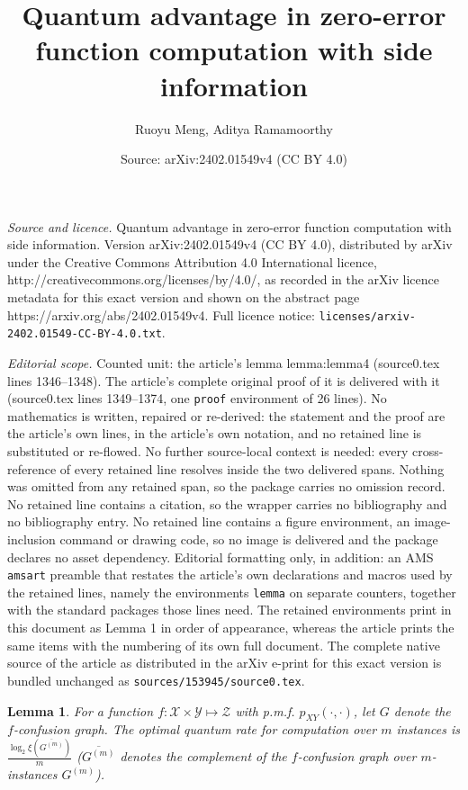 \documentclass[10pt,a4paper]{amsart}
\title{Quantum advantage in zero-error function computation with side information}
\author{Ruoyu Meng, Aditya Ramamoorthy}
\date{Source: arXiv:2402.01549v4 (CC BY 4.0)}
\newtheorem{lemma}{Lemma}
\newcommand{\calX}{\mathcal{X}}
\newcommand{\calY}{\mathcal{Y}}
\newcommand{\calZ}{\mathcal{Z}}
\begin{document}
\maketitle

\noindent\emph{Source and licence.} Quantum advantage in zero-error function computation with side information. Version arXiv:2402.01549v4 (CC BY 4.0), distributed by arXiv under the Creative Commons Attribution 4.0 International licence, http://creativecommons.org/licenses/by/4.0/, as recorded in the arXiv licence metadata for this exact version and shown on the abstract page https://arxiv.org/abs/2402.01549v4. Full licence notice: \texttt{licenses/arxiv-2402.01549-CC-BY-4.0.txt}.\par\smallskip

\noindent\textit{Editorial scope.} Counted unit: the article's lemma lemma:lemma4 (source0.tex lines 1346--1348). The article's complete original proof of it is delivered with it (source0.tex lines 1349--1374, one \texttt{proof} environment of 26 lines). No mathematics is written, repaired or re-derived: the statement and the proof are the article's own lines, in the article's own notation, and no retained line is substituted or re-flowed.  No further source-local context is needed: every cross-reference of every retained line resolves inside the two delivered spans.  Nothing was omitted from any retained span, so the package carries no omission record.  No retained line contains a citation, so the wrapper carries no bibliography and no bibliography entry.  No retained line contains a figure environment, an image-inclusion command or drawing code, so no image is delivered and the package declares no asset dependency.  Editorial formatting only, in addition: an AMS \texttt{amsart} preamble that restates the article's own declarations and macros used by the retained lines, namely the environments \texttt{lemma} on separate counters, together with the standard packages those lines need.  The retained environments print in this document as Lemma 1 in order of appearance, whereas the article prints the same items with the numbering of its own full document.  The complete native source of the article as distributed in the arXiv e-print for this exact version is bundled unchanged as \texttt{sources/153945/source0.tex}.
\begin{lemma}\label{lemma:lemma4}
For a function $f:\calX\times\calY \mapsto\calZ$ with p.m.f. $p_{XY}(\cdot,\cdot)$, let $G$ denote the $f$-confusion graph. The optimal quantum rate for computation over $m$ instances is $\frac{\log_2\xi(\overline{G^{(m)}})}{m}$ ($\overline{G^{(m)}}$ denotes the complement of the $f$-confusion graph over $m$-instances $G^{(m)}$).
\end{lemma}
\end{document}
